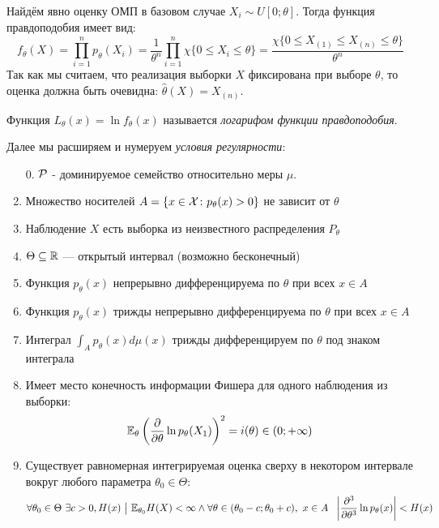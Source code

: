 \begin{example}
	Найдём явно оценку ОМП в базовом случае $X_i \sim U[0; \theta]$. Тогда функция правдоподобия имеет вид:
	\[
		f_\theta(X) = \prod_{i = 1}^n p_\theta(X_i) = \frac{1}{\theta^n} \prod_{i = 1}^n \chi\{0 \le X_i \le \theta\} = \frac{\chi\{0 \le X_{(1)} \le X_{(n)} \le \theta\}}{\theta^n}
	\]
	Так как мы считаем, что реализация выборки $X$ фиксирована при выборе $\theta$, то оценка должна быть очевидна: $\hat{\theta}(X) = X_{(n)}$.
\end{example}

\begin{definition}
	Функция $L_\theta(x) = \ln f_\theta(x)$ называется \textit{логарифом функции правдоподобия}.
\end{definition}

\begin{note}
	Далее мы расширяем и нумеруем \textit{условия регулярности}:
	\begin{enumerate}
		\item[0.] $\mathcal{P}$ - доминируемое семейство относительно меры $\mu$.
		
		\item Множество носителей $A = \{x \in \mathcal{X} \colon p_\theta(x) > 0\}$ не зависит от $\theta$
		
		\item Наблюдение $X$ есть выборка из неизвестного распределения $P_\theta$
		
		\item $\Theta \subseteq \mathbb{R}$ --- открытый интервал (возможно бесконечный)
		
		\item Функция $p_\theta(x)$ непрерывно дифференцируема по $\theta$ при всех $x \in A$
		
		\item Функция $p_\theta(x)$ трижды непрерывно дифференцируема по $\theta$ при всех $x \in A$
		
		\item Интеграл $\int_A p_\theta(x)d\mu(x)$ трижды дифференцируем по $\theta$ под знаком интеграла
		
		\item Имеет место конечность информации Фишера для одного наблюдения из выборки:
		\[
			\mathbb{E}_\theta\left(\frac{\partial }{\partial \theta} \ln p_\theta(X_1)\right)^2 = i(\theta) \in (0; +\infty)
		\]
		
		\item Существует равномерная интегрируемая оценка сверху в некотором интервале вокруг любого параметра $\theta_0 \in \Theta$:
		\[
			\forall \theta_0 \in \Theta\ \exists c > 0, H(x) \ \big|\  \mathbb{E}_{\theta_0} H(X) < \infty \wedge \forall \theta \in (\theta_0 - c; \theta_0 + c),\ x \in A\ \ \left|\frac{\partial ^3}{\partial \theta^3} \ln p_\theta(x)\right| < H(x)
		\]
	\end{enumerate}
\end{note}

